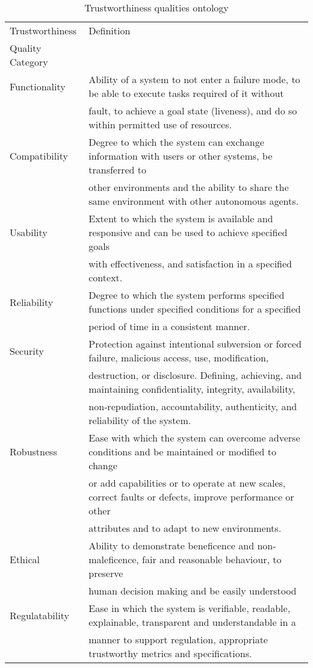 \begin{table*}[t]
\caption{Trustworthiness qualities ontology}\label{tab:quals}
\centering
\begin{tabular}{ll}
\toprule
Trustworthiness  & Definition                \\ 
Quality Category   &   \\ \midrule

Functionality & Ability of a system to not enter a failure mode, to be able to execute tasks required of it without \\
&fault, to achieve a goal state (liveness), and do so within permitted use of resources.\\

Compatibility & Degree to which the system can exchange information with users or other systems, be transferred to\\
&other environments and the ability to share the same environment with other autonomous agents.\\

Usability & Extent to which the system is available and responsive and can be used to achieve specified goals\\
&with effectiveness, and satisfaction in a specified context.\\

Reliability & Degree to which the system performs specified functions under specified conditions for a specified\\
&period of time in a consistent manner.\\

Security & Protection against intentional subversion or forced failure, malicious access, use, modification, \\
&destruction, or disclosure. Defining, achieving, and maintaining confidentiality, integrity, availability, \\
&non‐repudiation, accountability, authenticity, and reliability of the system. \\

Robustness & Ease with which the system can overcome adverse conditions and be maintained or modified to change\\
&or add capabilities or to operate at new scales, correct faults or defects, improve performance or other\\
&attributes and to adapt to new environments.\\

Ethical & Ability to demonstrate beneficence and non-maleficence, fair and reasonable behaviour, to preserve\\
&human decision making and be easily understood\\

Regulatability & Ease in which the system is verifiable, readable, explainable, transparent and understandable in a \\
&manner to support regulation, appropriate trustworthy metrics and specifications.\\

\bottomrule
\end{tabular}

\label{tab:ontology}
\end{table*}
